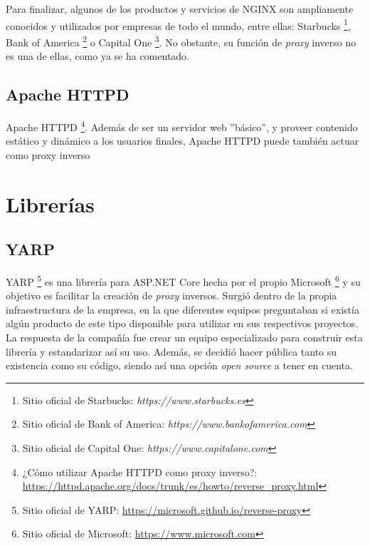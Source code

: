\documentclass[11pt,spanish,listoffigures]{tfgetsinf}
\begin{document}
Para finalizar, algunos de los productos y servicios de NGINX son ampliamente conocidos y utilizados por empresas de todo el mundo, entre ellas: Starbucks \footnote{Sitio oficial de Starbucks: \emph{https://www.starbucks.es}}, Bank of America \footnote{Sitio oficial de Bank of America: \emph{https://www.bankofamerica.com}} o Capital One \footnote{Sitio oficial de Capital One: \emph{https://www.capitalone.com}}. No obstante, su función de \emph{proxy} inverso no es una de ellas, como ya se ha comentado.


		\subsection{Apache HTTPD}

Apache HTTPD \footnote{¿Cómo utilizar Apache HTTPD como proxy inverso?: \url{https://httpd.apache.org/docs/trunk/es/howto/reverse_proxy.html}}. Además de ser un servidor web ''básico'', y proveer contenido estático y dinámico a los usuarios finales, Apache HTTPD puede también actuar como proxy inverso


	\section{Librerías}


		\subsection{YARP}

YARP \footnote{Sitio oficial de YARP: \url{https://microsoft.github.io/reverse-proxy}} es una librería para ASP.NET Core hecha por el propio Microsoft \footnote{Sitio oficial de Microsoft: \url{https://www.microsoft.com}} y su objetivo es facilitar la creación de \emph{proxy} inversos. Surgió dentro de la propia infraestructura de la empresa, en la que diferentes equipos preguntaban si existía algún producto de este tipo disponible para utilizar en sus respectivos proyectos. La respuesta de la compañía fue crear un equipo especializado para construir esta librería y estandarizar así su uso. Además, se decidió hacer pública tanto su existencia como su código, siendo así una opción \emph{open source} a tener en cuenta.
\end{document}
